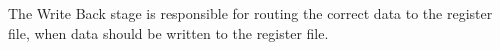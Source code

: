The Write Back stage is responsible for routing the correct data to the register file, when data should be written to the register file.
